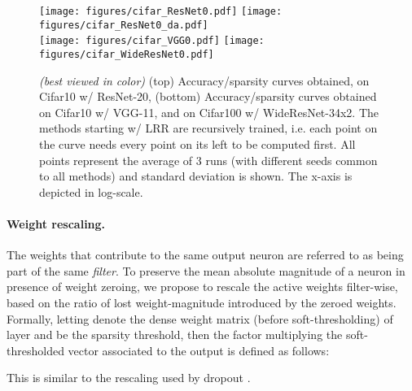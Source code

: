 \documentclass[10pt,twocolumn,letterpaper]{article}
\begin{document}
\begin{figure*}
  \centering
\texttt{[image: figures/cifar\_ResNet0.pdf]}
\texttt{[image: figures/cifar\_ResNet0\_da.pdf]}\\

\texttt{[image: figures/cifar\_VGG0.pdf]}
\texttt{[image: figures/cifar\_WideResNet0.pdf]}


  \caption{\textit{(best viewed in color)} (top) Accuracy/sparsity curves obtained, on Cifar10 w/ ResNet-20, (bottom) Accuracy/sparsity curves obtained on Cifar10 w/ VGG-11, and on Cifar100 w/ WideResNet-34x2. The methods starting w/ LRR are recursively trained, i.e. each point on the curve needs every point on its left to be computed first. All points represent the average of 3 runs (with different seeds common to all methods) and standard deviation is shown. The x-axis is depicted in log-scale.
}
  \label{fig:cifar}
\end{figure*}

\paragraph{Weight rescaling.}
The weights that contribute to the same output neuron are referred to as being part of the same \emph{filter}. 
To preserve the mean absolute magnitude of a neuron in presence of weight zeroing, we propose to rescale the active weights filter-wise, based on the ratio of lost weight-magnitude introduced by the zeroed weights. Formally, letting  denote the dense weight matrix (before soft-thresholding) of layer  and  be the sparsity threshold, then the factor multiplying the soft-thresholded vector associated to the  output is defined as follows:

\begin{footnotesize}

\end{footnotesize}



\noindent This is similar to the rescaling used by dropout \cite{srivastava14a}. 
\end{document}
